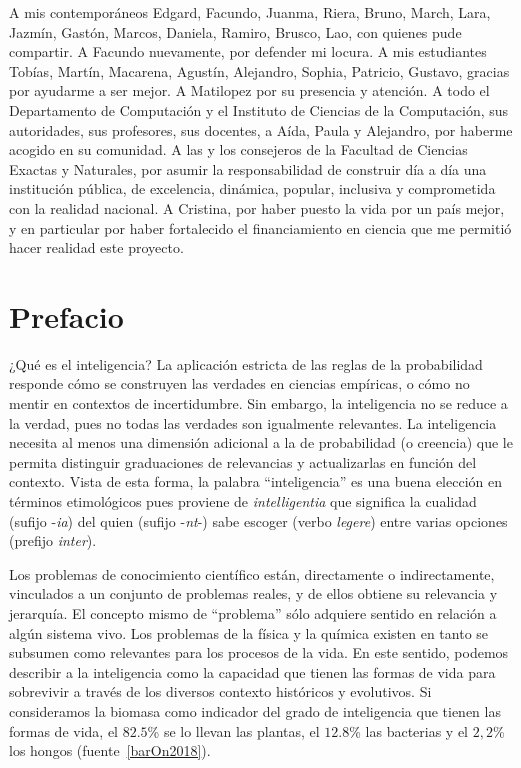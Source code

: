 \documentclass[a4paper,11pt]{book}
\theoremstyle{definition}
\begin{document}
%
A mis contemporáneos Edgard, Facundo, Juanma, Riera, Bruno, March, Lara, Jazmín, Gastón, Marcos, Daniela, Ramiro, Brusco, Lao, con quienes pude compartir.
%
A Facundo nuevamente, por defender mi locura.
%
A mis estudiantes Tobías, Martín, Macarena, Agustín, Alejandro, Sophia, Patricio, Gustavo, gracias por ayudarme a ser mejor.
%
A Matilopez por su presencia y atención.
%
A todo el Departamento de Computación y el Instituto de Ciencias de la Computación, sus autoridades, sus profesores, sus docentes, a Aída, Paula y Alejandro, por haberme acogido en su comunidad.
%
A las y los consejeros de la Facultad de Ciencias Exactas y Naturales, por asumir la responsabilidad de construir día a día una institución pública, de excelencia, dinámica, popular, inclusiva y comprometida con la realidad nacional.
%
A Cristina, por haber puesto la vida por un país mejor, y en particular por haber fortalecido el financiamiento en ciencia que me permitió hacer realidad este proyecto.


\chapter*{Prefacio}

¿Qué es el inteligencia?
%
La aplicación estricta de las reglas de la probabilidad responde cómo se construyen las verdades en ciencias empíricas, o cómo no mentir en contextos de incertidumbre.
%
Sin embargo, la inteligencia no se reduce a la verdad, pues no todas las verdades son igualmente relevantes.
%
La inteligencia necesita al menos una dimensión adicional a la de probabilidad (o creencia) que le permita distinguir graduaciones de relevancias y actualizarlas en función del contexto.
%
Vista de esta forma, la palabra ``inteligencia'' es una buena elección en términos etimológicos pues proviene de \emph{intelligentia} que significa la cualidad (sufijo -\emph{ia}) del quien (sufijo -\emph{nt}-) sabe escoger (verbo \emph{legere}) entre varias opciones (prefijo \emph{inter}).


Los problemas de conocimiento científico están, directamente o indirectamente, vinculados a un conjunto de problemas reales, y de ellos obtiene su relevancia y jerarquía.
%
El concepto mismo de ``problema'' sólo adquiere sentido en relación a algún sistema vivo.
%
Los problemas de la física y la química existen en tanto se subsumen como relevantes para los procesos de la vida.
%
En este sentido, podemos describir a la inteligencia como la capacidad que tienen las formas de vida para sobrevivir a través de los diversos contexto históricos y evolutivos.
%
Si consideramos la biomasa como indicador del grado de inteligencia que tienen las formas de vida, el $82.5$\% se lo llevan las plantas, el $12.8$\% las bacterias y el $2,2$\% los hongos (fuente~\ref{barOn2018}).
\end{document}
